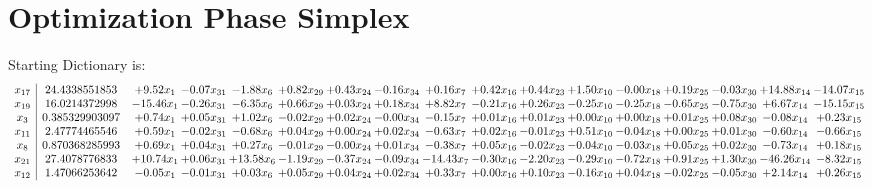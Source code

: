 \documentclass[9pt]{article}
\begin{document}
\section{Optimization Phase Simplex}
Starting Dictionary is:
\[\begin{array}{c| c c@{\hskip 2pt} c@{\hskip 2pt} c@{\hskip 2pt} c@{\hskip 2pt} c@{\hskip 2pt} c@{\hskip 2pt} c@{\hskip 2pt} c@{\hskip 2pt} c@{\hskip 2pt} c@{\hskip 2pt} c@{\hskip 2pt} c@{\hskip 2pt} c@{\hskip 2pt} c@{\hskip 2pt} c@{\hskip 2pt} }
 x_{17}   &  24.4338551853 & +  9.52 x_{1} & -0.07 x_{31} & -1.88 x_{6} & +  0.82 x_{29} & +  0.43 x_{24} & -0.16 x_{34} & +  0.16 x_{7} & +  0.42 x_{16} & +  0.44 x_{23} & +  1.50 x_{10} & -0.00 x_{18} & +  0.19 x_{25} & -0.03 x_{30} & + 14.88 x_{14} & -14.07 x_{15}\\
 x_{19}   &  16.0214372998 & -15.46 x_{1} & -0.26 x_{31} & -6.35 x_{6} & +  0.66 x_{29} & +  0.03 x_{24} & +  0.18 x_{34} & +  8.82 x_{7} & -0.21 x_{16} & +  0.26 x_{23} & -0.25 x_{10} & -0.25 x_{18} & -0.65 x_{25} & -0.75 x_{30} & +  6.67 x_{14} & -15.15 x_{15}\\
 x_{3}   &  0.385329903097 & +  0.74 x_{1} & +  0.05 x_{31} & +  1.02 x_{6} & -0.02 x_{29} & +  0.02 x_{24} & -0.00 x_{34} & -0.15 x_{7} & +  0.01 x_{16} & +  0.01 x_{23} & +  0.00 x_{10} & +  0.00 x_{18} & +  0.01 x_{25} & +  0.08 x_{30} & -0.08 x_{14} & +  0.23 x_{15}\\
 x_{11}   &  2.47774465546 & +  0.59 x_{1} & -0.02 x_{31} & -0.68 x_{6} & +  0.04 x_{29} & +  0.00 x_{24} & +  0.02 x_{34} & -0.63 x_{7} & +  0.02 x_{16} & -0.01 x_{23} & +  0.51 x_{10} & -0.04 x_{18} & +  0.00 x_{25} & +  0.01 x_{30} & -0.60 x_{14} & -0.66 x_{15}\\
 x_{8}   &  0.870368285993 & +  0.69 x_{1} & +  0.04 x_{31} & +  0.27 x_{6} & -0.01 x_{29} & -0.00 x_{24} & +  0.01 x_{34} & -0.38 x_{7} & +  0.05 x_{16} & -0.02 x_{23} & -0.04 x_{10} & -0.03 x_{18} & +  0.05 x_{25} & +  0.02 x_{30} & -0.73 x_{14} & +  0.18 x_{15}\\
 x_{21}   &  27.4078776833 & + 10.74 x_{1} & +  0.06 x_{31} & + 13.58 x_{6} & -1.19 x_{29} & -0.37 x_{24} & -0.09 x_{34} & -14.43 x_{7} & -0.30 x_{16} & -2.20 x_{23} & -0.29 x_{10} & -0.72 x_{18} & +  0.91 x_{25} & +  1.30 x_{30} & -46.26 x_{14} & -8.32 x_{15}\\
 x_{12}   &  1.47066253642 & -0.05 x_{1} & -0.01 x_{31} & +  0.03 x_{6} & +  0.05 x_{29} & +  0.04 x_{24} & +  0.02 x_{34} & +  0.33 x_{7} & +  0.00 x_{16} & +  0.10 x_{23} & -0.16 x_{10} & +  0.04 x_{18} & -0.02 x_{25} & -0.05 x_{30} & +  2.14 x_{14} & +  0.26 x_{15}\\

\end{array}\]
\end{document}
